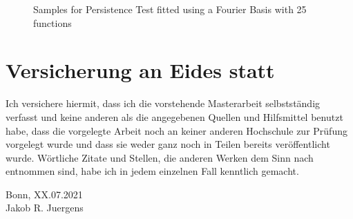 \documentclass[12pt, a4paper]{article}
\theoremstyle{MAstyle} \newtheorem{assumption}{Assumption}[section]
\theoremstyle{MAstyle} \newtheorem{definition}{Definition}[section]
\theoremstyle{MAstyle} \newtheorem{theorem}{Theorem}[section]
\begin{document}
		
			\begin{figure}[H]
				\caption{Samples for Persistence Test fitted using a Fourier Basis with 25 functions}
				\label{persistence_samples_basis_problem}
			\end{figure}
		
		
		
	\newpage
	\thispagestyle{empty}
	\section*{Versicherung an Eides statt}	
	
		\vspace{3cm}
		
		Ich versichere hiermit, dass ich die vorstehende Masterarbeit
		selbstständig verfasst und keine anderen als die angegebenen Quellen
		und Hilfsmittel benutzt habe, dass die vorgelegte Arbeit noch an keiner
		anderen Hochschule zur Prüfung vorgelegt wurde und dass sie weder
		ganz noch in Teilen bereits veröffentlicht wurde. Wörtliche Zitate und
		Stellen, die anderen Werken dem Sinn nach entnommen sind, habe ich
		in jedem einzelnen Fall kenntlich gemacht.
		
		\vspace{2cm}
		Bonn, XX.07.2021 \hrulefill \\
		\hspace*{0mm}Jakob R. Juergens
		
		\vspace{\fill}
\end{document}
